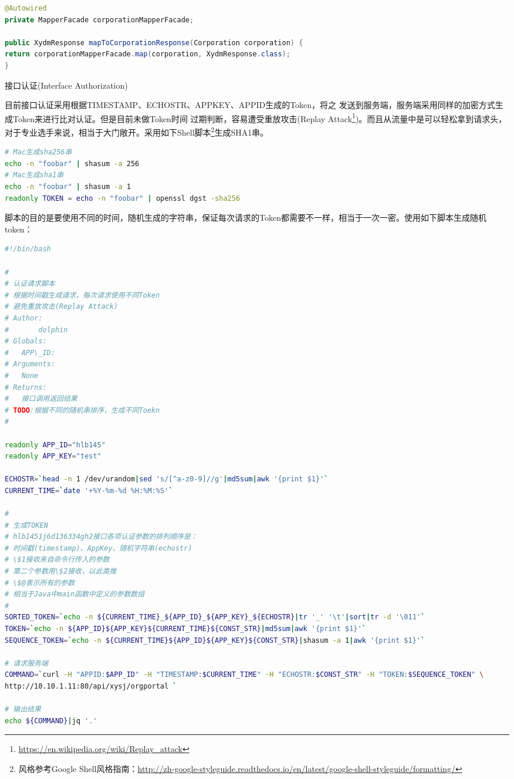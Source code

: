 \documentclass[12pt]{book}
\makeatletter
\numberwithin{dummy}{section}
\theoremstyle{ocrenumbox}
\theoremstyle{blacknumex}
\theoremstyle{blacknumbox}
\theoremstyle{ocrenum}
\renewcommand{\subsection}{\@startsection {subsection}{2}{\z@}
	{-3ex \@plus -0.1ex \@minus -.4ex}
	{0.5ex \@plus.2ex }
	{\normalfont\sffamily\bfseries}}
\newlength\esp
\makeatother
\begin{document}
\begin{lstlisting}[language=Java]
@Autowired
private MapperFacade corporationMapperFacade;

public XydmResponse mapToCorporationResponse(Corporation corporation) {
return corporationMapperFacade.map(corporation, XydmResponse.class);
}
\end{lstlisting}

\subsection{接口认证(Interface Authorization)}
\label{sec:authorization}

目前接口认证采用根据TIMESTAMP、ECHOSTR、APPKEY、APPID生成的Token，将之
发送到服务端，服务端采用同样的加密方式生成Token来进行比对认证。但是目前未做Token时间
过期判断，容易遭受重放攻击(Replay Attack\footnote{\url{https://en.wikipedia.org/wiki/Replay_attack}})。而且从流量中是可以轻松拿到请求头，对于专业选手来说，相当于大门敞开。采用如下Shell脚本\footnote{风格参考Google Shell风格指南：\url{http://zh-google-styleguide.readthedocs.io/en/latest/google-shell-styleguide/formatting/}}生成SHA1串。

\begin{lstlisting}[language=Bash]
# Mac生成sha256串
echo -n "foobar" | shasum -a 256
# Mac生成sha1串
echo -n "foobar" | shasum -a 1
readonly TOKEN = echo -n "foobar" | openssl dgst -sha256
\end{lstlisting}

脚本的目的是要使用不同的时间，随机生成的字符串，保证每次请求的Token都需要不一样，相当于一次一密。使用如下脚本生成随机token：

\begin{lstlisting}[language=Bash]
#!/bin/bash

#
# 认证请求脚本
# 根据时间戳生成请求，每次请求使用不同Token
# 避免重放攻击(Replay Attack)
# Author:
# 		dolphin
# Globals:
#   APP\_ID:
# Arguments:
#   None
# Returns:
#   接口调用返回结果
# TODO:根据不同的随机串排序，生成不同Toekn
#

readonly APP_ID="hlb145"
readonly APP_KEY="test"

ECHOSTR=`head -n 1 /dev/urandom|sed 's/[^a-z0-9]//g'|md5sum|awk '{print $1}'`
CURRENT_TIME=`date '+%Y-%m-%d %H:%M:%S'`

#
# 生成TOKEN
# hlb1451j6d136334gh2接口各项认证参数的排列顺序是：
# 时间戳(timestamp)、AppKey、随机字符串(echostr)
# \$1接收来自命令行传入的参数
# 第二个参数用\$2接收，以此类推
# \$@表示所有的参数
# 相当于Java中main函数中定义的参数数组
#
SORTED_TOKEN=`echo -n ${CURRENT_TIME}_${APP_ID}_${APP_KEY}_${ECHOSTR}|tr '_' '\t'|sort|tr -d '\011'`
TOKEN=`echo -n ${APP_ID}${APP_KEY}${CURRENT_TIME}${CONST_STR}|md5sum|awk '{print $1}'`
SEQUENCE_TOKEN=`echo -n ${CURRENT_TIME}${APP_ID}${APP_KEY}${CONST_STR}|shasum -a 1|awk '{print $1}'`

# 请求服务端
COMMAND=`curl -H "APPID:$APP_ID" -H "TIMESTAMP:$CURRENT_TIME" -H "ECHOSTR:$CONST_STR" -H "TOKEN:$SEQUENCE_TOKEN" \
http://10.10.1.11:80/api/xysj/orgportal `

# 输出结果
echo ${COMMAND}|jq '.'
\end{lstlisting}
\end{document}
